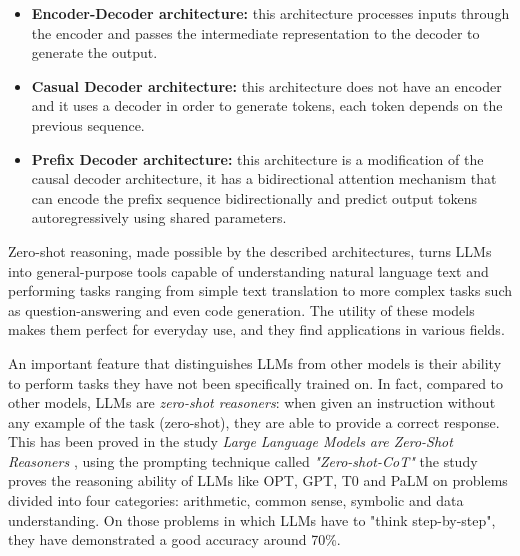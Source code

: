 \begin{itemize}
    \item \textbf{Encoder-Decoder architecture:} this architecture processes inputs through the encoder and passes the intermediate representation to the decoder to generate the output.\cite{encoder_medium}

    \item \textbf{Casual Decoder architecture:} this architecture does not have an encoder and it uses a decoder in order to generate tokens, each token depends on the previous sequence. \cite{uniteai_decoder}

    \item \textbf{Prefix Decoder architecture:} this architecture is a modification of the causal decoder architecture, it has a bidirectional attention mechanism that can encode the prefix sequence bidirectionally and predict output tokens autoregressively using shared parameters. \cite{llm_labeller}
\end{itemize}
Zero-shot reasoning, made possible by the described architectures, turns LLMs into general-purpose tools capable of understanding natural language text and performing tasks ranging from simple text translation to more complex tasks such as question-answering and even code generation. The utility of these models makes them perfect for everyday use, and they find applications in various fields. 

An important feature that distinguishes LLMs from other models is their ability to perform tasks they have not been specifically trained on.
In fact, compared to other models, LLMs are \textit{zero-shot reasoners}: when given an instruction without any example of the task (zero-shot), they are able to provide a correct response.
This has been proved in the study \textit{Large Language Models are Zero-Shot Reasoners} \cite{kojima2022large}, using the prompting technique called \textit{"Zero-shot-CoT"} the study proves the reasoning ability of LLMs like OPT, GPT, T0 and PaLM on problems divided into four categories: arithmetic, common sense, symbolic and data understanding.
On those problems in which LLMs have to "think step-by-step", they have demonstrated a good accuracy around 70\%.

